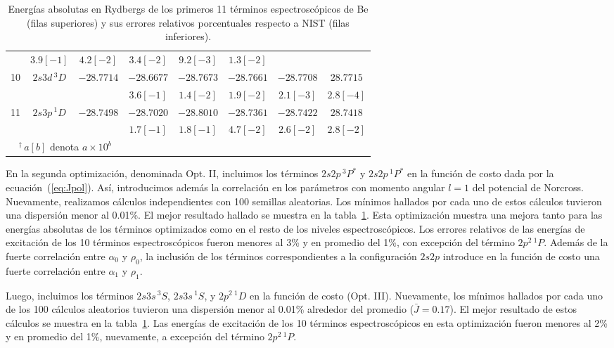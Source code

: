 \begin{table}
\begin{tabular}{*{8}{c}}
  & $3.9[-1]$   & $4.2[-2]$  & $3.4[-2]$  & $9.2[-3]$  & $1.3[-2]$ \\  
10& $2s3d\,^3D$ & $-28.7714$ 
  & $-28.6677$  & $-28.7673$ & $-28.7661$ & $-28.7708$ & $28.7715$ \\ \rowcolor{mygray}  & & 
  & $3.6[-1]$   & $1.4[-2]$  & $1.9[-2]$  & $2.1[-3]$  & $2.8[-4]$ \\  
11& $2s3p\,^1D$ & $-28.7498$ 
  & $-28.7020$  & $-28.8010$ & $-28.7361$ & $-28.7422$ & $28.7418$ \\ \rowcolor{mygray}  & & 
  & $1.7[-1]$   & $1.8[-1]$  & $4.7[-2]$  & $2.6[-2]$  & $2.8[-2]$ \\ 
\multicolumn{3}{c}{$\,^{\dagger}\,a[b]$ denota $a\times 10^b$} \\
\end{tabular}
\caption[Energías absolutas de Be.]
{Energías absolutas en Rydbergs de los primeros 11 términos 
espectroscópicos de Be (filas superiores) y sus errores relativos 
porcentuales respecto a NIST (filas inferiores).}
\label{tab:optpol}
\end{table}

En la segunda optimización, denominada Opt. II, incluimos los términos 
$2s2p\,^3P^*$ y $2s2p\,^1P^*$ en la función de costo dada por la 
ecuación~(\ref{eq:Jpol}). Así, introducimos además la correlación en los 
parámetros con momento angular $l=1$ del potencial de Norcross. 
Nuevamente, realizamos cálculos independientes con 100 semillas aleatorias. 
Los mínimos hallados por cada uno de estos cálculos tuvieron una 
dispersión menor al 0.01\%. El mejor resultado hallado se muestra en la 
tabla~\ref{tab:optpol}. Esta optimización muestra una mejora tanto para 
las energías absolutas de los términos optimizados como en el resto de 
los niveles espectroscópicos. Los errores relativos de las energías de 
excitación de los 10 términos espectroscópicos fueron menores al 3\% y en 
promedio del 1\%, con excepción del término $2p^2\,^1P$. Además de la 
fuerte correlación entre $\alpha_0$ y $\rho_0$, la inclusión de los 
términos correspondientes a la configuración $2s2p$ introduce en la 
función de costo una fuerte correlación entre $\alpha_1$ y $\rho_1$.

Luego, incluimos los términos $2s3s\,^3S$, $2s3s\,^1S$, y $2p^2\,^1D$ en 
la función de costo (Opt. III). Nuevamente, los mínimos hallados por cada 
uno de los 100 cálculos aleatorios tuvieron una dispersión menor al 
0.01\% alrededor del promedio ($\bar{J}=0.17$). El mejor resultado de 
estos cálculos se muestra en la tabla~\ref{tab:optpol}. Las energías de 
excitación de los 10 términos espectroscópicos en esta optimización 
fueron menores al 2\% y en promedio del 1\%, nuevamente, a excepción del 
término $2p^2\,^1P$. 

